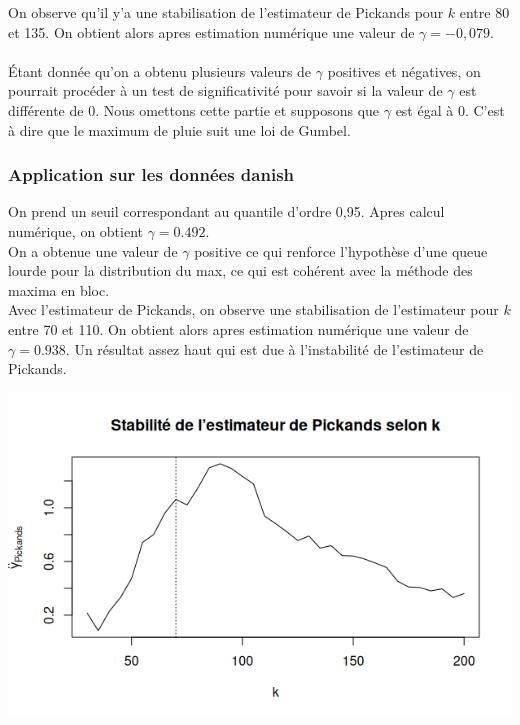 \documentclass{article}
\theoremstyle{plain}
\theoremstyle{definition}
\theoremstyle{plain}
\begin{document}
\noindent On observe qu'il y'a une stabilisation de l'estimateur de Pickands pour $k$ entre 80 et 135. On obtient alors apres estimation numérique une valeur de $\gamma = -0,079$.
\\
\\
Étant donnée qu'on a obtenu plusieurs valeurs de $\gamma$ positives et négatives, on pourrait procéder à un test de significativité pour savoir si la valeur de $\gamma$ est différente de 0. Nous omettons cette partie et supposons que $\gamma$ est égal à 0. C'est à dire que le maximum de pluie suit une loi de Gumbel.
\\
\subsubsection{Application sur les données danish}

\noindent On prend un seuil correspondant au quantile d’ordre 0,95. Apres calcul numérique, on obtient $\gamma = 0.492$.
\\
On a obtenue une valeur de $\gamma$ positive ce qui renforce l'hypothèse d'une queue lourde pour la distribution du max, ce qui est cohérent avec la méthode des maxima en bloc. 
\\
Avec l'estimateur de Pickands, on observe une stabilisation de l'estimateur pour $k$ entre 70 et 110. On obtient alors apres estimation numérique une valeur de $\gamma = 0.938$. Un résultat assez haut qui est due à l'instabilité de l'estimateur de Pickands. 

\begin{center}
	\includegraphics[scale=0.65]{./images/pickandsdansih.png} 
\end{center}
\end{document}
